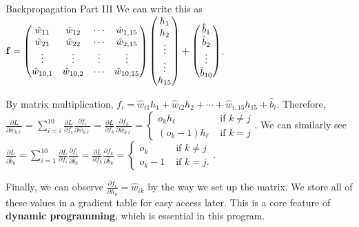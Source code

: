\documentclass[xcolor=dvipsnames, fontsize=11pt, %
pagesize, %
parskip=half-, t]{beamer}
\begin{document}
\begin{frame}{Backpropagation Part III}
We can write this as $\bold{f}=\begin{pmatrix} \hat{w}_{11} & \hat{w}_{12} & \cdots & \hat{w}_{1,15} \\ \hat{w}_{21} & \hat{w}_{22} & \cdots & \hat{w}_{2,15} \\ \vdots & \vdots & \vdots & \vdots \\ \hat{w}_{10,1} & \hat{w}_{10,2} & \cdots & \hat{w}_{10,15} \end{pmatrix}\begin{pmatrix} h_{1} \\ h_2 \\ \vdots \\ \vdots \\ h_{15} \end{pmatrix}+\begin{pmatrix} \hat{b}_{1} \\ \hat{b}_2 \\ \vdots \\ \hat{b}_{10} \end{pmatrix}$. \vspace{0.025\textheight}  

By matrix multiplication, $f_i=\hat{w}_{i1}h_1+\hat{w}_{i2}h_2+\cdots+\hat{w}_{i,15}h_{15}+\hat{b}_i$.  Therefore, $\displaystyle \frac{\partial L}{\partial \hat{w}_{k\ell}}=\sum_{i=i}^{10} \frac{\partial L}{\partial f_i}\frac{\partial f_i}{\partial \hat{w}_{k\ell }}=\frac{\partial L}{\partial f_k}\frac{\partial f_k}{\partial \hat{w}_{k\ell}}=\begin{cases} o_kh_{\ell} & \text{ if } k\neq j \\ 
\left(o_k-1\right)h_{\ell} & \text{ if } k=j \end{cases}$.  We can similarly see $\displaystyle \frac{\partial L}{\partial \hat{b}_k}=\sum_{i=1}^{10} \frac{\partial L}{\partial f_i}\frac{\partial f_i}{\partial \hat{b}_k}=\frac{\partial L}{\partial f_k}\frac{\partial f_k}{\partial \hat{b}_k}=\begin{cases} o_k & \text{ if } k\neq j \\ o_k-1&  \text{ if } k=j. \end{cases}$.  \vspace{0.025\textheight}

Finally, we can observe $\frac{\partial f_i}{\partial h_k}=\hat{w}_{ik}$ by the way we set up the matrix. We store all of these values in a gradient table for easy access later. This is a core feature of \textbf{dynamic programming}, which is essential in this program.
\end{frame}
\end{document}
